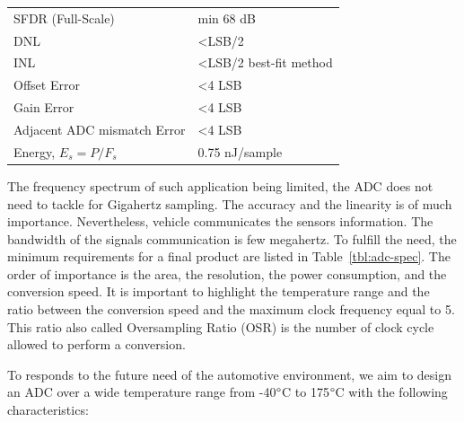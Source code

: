 \begin{table}[htp]
\begin{tabular}{ll}
		SFDR (Full-Scale)                & min 68 dB                                                                                               \\
		DNL                              & \textless LSB/2                                                                                       \\
		INL                              & \textless LSB/2 best-fit method                                                                                    \\
		Offset Error                     & \textless 4 LSB                                                                                                                                             \\
		Gain Error                       & \textless 4 LSB                                                                                                                                             \\
		Adjacent ADC mismatch Error      & \textless 4 LSB                                                                                                                                             \\
		Energy, $E_s = P/F_s$            & 0.75 nJ/sample      \\ \bottomrule                                                                                                                                       
	\end{tabular}
\end{table}

The frequency spectrum of such application being limited, the ADC does not need to tackle for Gigahertz sampling. The accuracy and the linearity is of much importance. Nevertheless, vehicle communicates the sensors information. The bandwidth of the signals communication is few megahertz.
To fulfill the need, the minimum requirements for a final product are listed in Table~\ref{tbl:adc-spec}. The order of importance is the area, the resolution, the power consumption, and the conversion speed. It is important to highlight the temperature range and the ratio between the conversion speed and the maximum clock frequency equal to 5. This ratio also called Oversampling Ratio (OSR) is the number of clock cycle allowed to perform a conversion.

To responds to the future need of the automotive environment, we aim to design an ADC over a wide temperature range from -40\(\degree \)C to 175\(\degree \)C with the following characteristics:

